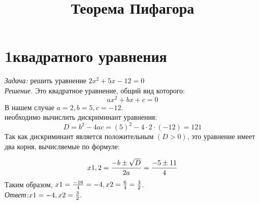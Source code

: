 \documentclass[12pt]{article}
\date{}
\title{Теорема Пифагора}
\begin{document}
\section{1 квадратного уравнения}

\maketitle
\textit{Задача:} решить уравнение $2x^2 + 5x - 12 = 0$\\
\quad\textit{Решение.} Это квадратное уравнение, общий вид которого:
\[ax^2+bx+c=0\]
В нашем случае $a = 2, b = 5, c = -12$.\\
 необходимо вычислить дискриминант уравнения:
\[D = b^2 - 4ac = (5)^2 - 4\cdot2\cdot(-12) = 121\]
Так как дискриминант является положительным $(D > 0)$, это уравнение имеет два корня, вычисляемые по формуле:

\[x{\tiny{1,2}}=\frac{-b\pm\sqrt{D}}{2a}=\frac{-5\pm11}{4}\]
Таким образом, $x{\tiny1}=\frac{-16}{4} = -4, x{\tiny2}=\frac{6}{4}=\frac{3}{2}$.\\
\quad\textit{Ответ:}$x{\tiny1}=-4, x{\tiny2}=\frac{3}{2}$.
\end{document}
